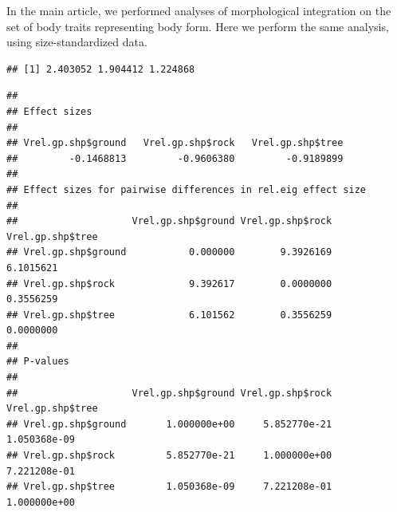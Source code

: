\documentclass[
  11pt,
]{article}
\newenvironment{Shaded}{\begin{snugshade}}{\end{snugshade}}
\newcommand{\AttributeTok}[1]{\textcolor[rgb]{0.77,0.63,0.00}{#1}}
\newcommand{\ControlFlowTok}[1]{\textcolor[rgb]{0.13,0.29,0.53}{\textbf{#1}}}
\newcommand{\DecValTok}[1]{\textcolor[rgb]{0.00,0.00,0.81}{#1}}
\newcommand{\FloatTok}[1]{\textcolor[rgb]{0.00,0.00,0.81}{#1}}
\newcommand{\FunctionTok}[1]{\textcolor[rgb]{0.00,0.00,0.00}{#1}}
\newcommand{\NormalTok}[1]{#1}
\newcommand{\OtherTok}[1]{\textcolor[rgb]{0.56,0.35,0.01}{#1}}
\newcommand{\SpecialCharTok}[1]{\textcolor[rgb]{0.00,0.00,0.00}{#1}}
\begin{document}
In the main article, we performed analyses of morphological integration
on the set of body traits representing body form. Here we perform the
same analysis, using size-standardized data.

\begin{Shaded}
\end{Shaded}

\begin{verbatim}
## [1] 2.403052 1.904412 1.224868
\end{verbatim}

\begin{Shaded}
\end{Shaded}

\begin{verbatim}
## 
## Effect sizes
## 
## Vrel.gp.shp$ground   Vrel.gp.shp$rock   Vrel.gp.shp$tree 
##         -0.1468813         -0.9606380         -0.9189899 
## 
## Effect sizes for pairwise differences in rel.eig effect size
## 
##                    Vrel.gp.shp$ground Vrel.gp.shp$rock Vrel.gp.shp$tree
## Vrel.gp.shp$ground           0.000000        9.3926169        6.1015621
## Vrel.gp.shp$rock             9.392617        0.0000000        0.3556259
## Vrel.gp.shp$tree             6.101562        0.3556259        0.0000000
## 
## P-values
## 
##                    Vrel.gp.shp$ground Vrel.gp.shp$rock Vrel.gp.shp$tree
## Vrel.gp.shp$ground       1.000000e+00     5.852770e-21     1.050368e-09
## Vrel.gp.shp$rock         5.852770e-21     1.000000e+00     7.221208e-01
## Vrel.gp.shp$tree         1.050368e-09     7.221208e-01     1.000000e+00
\end{verbatim}
\end{document}
